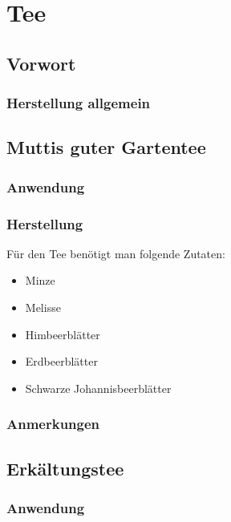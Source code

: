 \chapter{Tee}

\section{Vorwort}

\lipsum[1-5]
\newpage



\subsection{Herstellung allgemein}



\section{Muttis guter Gartentee}

\subsection{Anwendung}

\subsection{Herstellung}

Für den Tee benötigt man folgende Zutaten:

\begin{itemize}
	\item Minze
	\item Melisse
	\item Himbeerblätter
	\item Erdbeerblätter
	\item Schwarze Johannisbeerblätter
\end{itemize}


\subsection{Anmerkungen}




\section{Erkältungstee}

\subsection{Anwendung}

